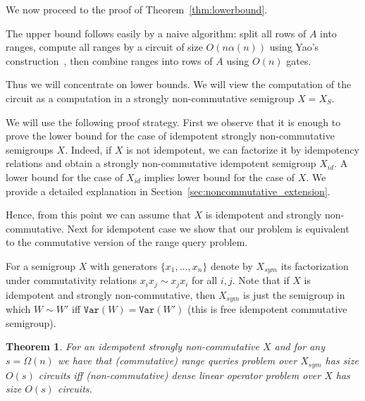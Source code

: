 \documentclass[11pt,letterpaper]{article}
\newtheorem{theorem}{Theorem}
\newcommand{\var}{\texttt{Var}}
\begin{document}

We now proceed to the proof of Theorem~\ref{thm:lowerbound}.

The upper bound follows easily by a naive algorithm: split all rows of $A$ into ranges, compute all ranges by a circuit of size $O(n\alpha(n))$ using Yao's construction~\cite{DBLP:conf/stoc/Yao82}, then combine ranges into rows of $A$ using $O(n)$ gates.

Thus we will concentrate on lower bounds. We will view the computation of the circuit as a computation in a strongly non-commutative semigroup $X=X_S$.

We will use the following proof strategy. 
First we observe that it is enough to prove the lower bound for the case of idempotent strongly non-commutative semigroups $X$. Indeed, if $X$ is not idempotent, we can factorize it by idempotency relations and obtain a strongly non-commutative idempotent semigroup $X_{id}$. A lower bound for the case of $X_{id}$ implies lower bound for the case of $X$. We provide a detailed explanation in Section~\ref{sec:noncommutative_extension}.

Hence, { from this point we can assume that $X$ is idempotent and strongly non-commutative}.
Next for idempotent case we show that our problem is equivalent to the commutative version of the range query problem.

For a semigroup $X$ with generators $\{x_1,\ldots, x_n\}$ denote by $X_{sym}$ its factorization under commutativity relations $x_i x_j \sim x_j x_i$ for all $i,j$. Note that if $X$ is idempotent and strongly non-commutative, then $X_{sym}$ is just the semigroup in which $W \sim W'$ iff $\var(W)=\var(W')$ (this is free idempotent commutative semigroup).

\begin{theorem}\label{thm:equivalence}
For an idempotent strongly non-commutative $X$ and for any $s=\Omega(n)$ we have that (commutative) range queries problem over $X_{sym}$ has size $O(s)$ circuits iff (non-commutative) dense linear operator problem over $X$ has size $O(s)$ circuits.
\end{theorem}
\end{document}
